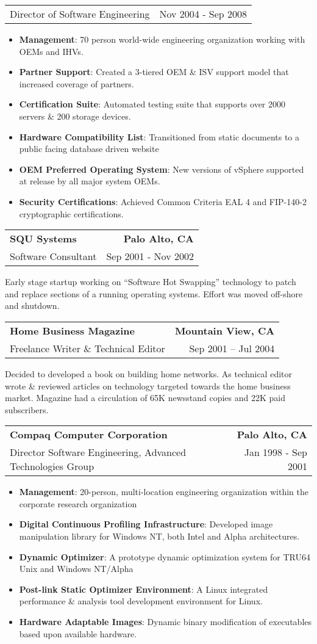 \documentclass[letterpaper,11pt]{article}
\makeatletter
\newcommand{\resumeCompanyHeading}[4]{
  \vspace{-1pt}
    \item
    \begin{tabular*}{1.0\textwidth}[t]{l@{\extracolsep{\fill}}r}
      \textbf{#1} & \textbf{#2} \\
      {#3} & {#4}
    \end{tabular*}\vspace{-10pt}
  }
\newcommand{\resumeCompanyPositionHeading}[2]{
      \item
      \begin{tabular*}{1.0\textwidth}{l@{\extracolsep{\fill}}r}
        {#1} & {#2}
    \end{tabular*}\vspace{-10pt}
}
\newcommand{\resumeJobDescription}[1][]{
    \vspace{-1pt}\par{#1}
}
\newcommand{\resumeItem}[2]{\item{{\textbf{\small#1}}: {\small#2 \vspace{-1pt}}}}
\newcommand{\resumeItemListStart}{\begin{itemize}}
\newcommand{\resumeItemListEnd}{\end{itemize}}\vspace{-10pt}
\makeatother
\begin{document}
          \resumeCompanyPositionHeading 
          {Director of Software Engineering}
          {Nov 2004 - Sep 2008}
            \resumeItemListStart
                \resumeItem{Management}{70 person world-wide engineering organization working with OEMs and IHVs.}
                \resumeItem{Partner Support}{Created a 3-tiered OEM \& ISV support model that increased coverage of partners.}
                \resumeItem{Certification Suite}{Automated testing suite that supports over 2000 servers \& 200 storage devices.}
                \resumeItem{Hardware Compatibility List}{Transitioned from static documents to a public facing database driven website}
                \resumeItem{OEM Preferred Operating System}{New versions of vSphere supported at release by all major system OEMs.}
                \resumeItem{Security Certifications}{Achieved Common Criteria EAL 4 and FIP-140-2 cryptographic certifications.}
            \resumeItemListEnd
  
          \resumeCompanyHeading
            {SQU Systems}{Palo Alto, CA}
            {Software Consultant}{Sep 2001 - Nov 2002}
              \resumeJobDescription{
                Early stage startup working on “Software Hot Swapping” technology to patch and replace sections of a running operating
                systems.  Effort was moved off-shore and shutdown.}

          \resumeCompanyHeading
            {Home Business Magazine}{Mountain View, CA}
            {Freelance Writer \& Technical Editor} {Sep 2001 – Jul 2004}
            \resumeJobDescription {Decided to developed a book on building home networks. As technical editor wrote \& reviewed articles on technology targeted 
              towards the home business market. Magazine had a circulation of 65K newsstand copies and 22K paid subscribers.}

          \resumeCompanyHeading
            {Compaq Computer Corporation}{Palo Alto, CA}
            {Director Software Engineering, Advanced Technologies Group}{Jan 1998 - Sep 2001}
            \resumeItemListStart
                \resumeItem{Management}{20-person, multi-location engineering organization within the corporate research organization}
                \resumeItem{Digital Continuous Profiling Infrastructure}{Developed image manipulation library for Windows NT, both Intel and Alpha architectures.}
                \resumeItem{Dynamic Optimizer}{A prototype dynamic optimization system for TRU64 Unix and Windows NT/Alpha}
                \resumeItem{Post-link Static Optimizer Environment}{A Linux integrated performance \& analysis tool development environment for Linux.}
                \resumeItem{Hardware Adaptable Images}{Dynamic binary modification of executables based upon available hardware.}
            \resumeItemListEnd
\end{document}
